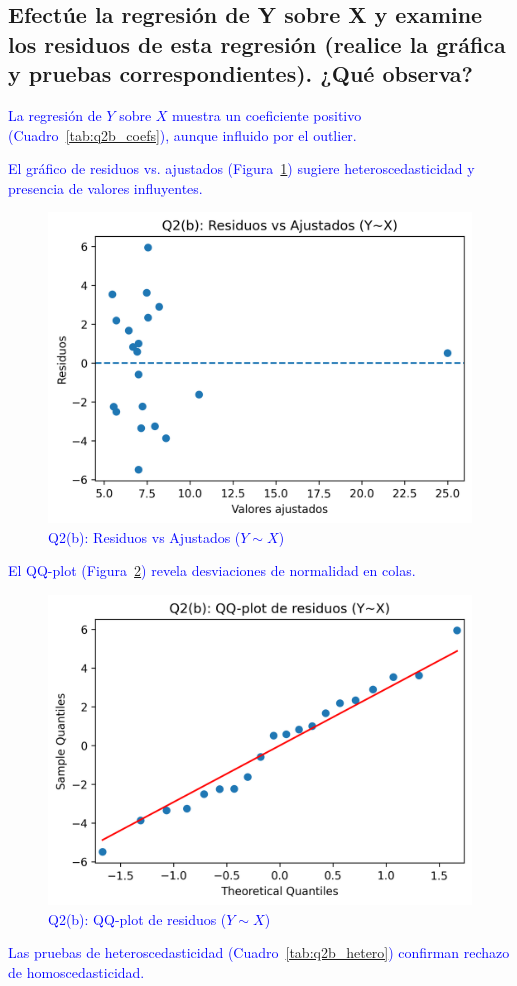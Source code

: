 \documentclass[10pt]{article}
\begin{document}
\subsection{Efectúe la regresión de Y sobre X y examine los residuos de esta regresión (realice la gráfica y pruebas correspondientes). ¿Qué observa?}
    \textcolor{blue}{
        La regresión de $Y$ sobre $X$ muestra un coeficiente positivo (Cuadro~\ref{tab:q2b_coefs}), aunque influido por el outlier.
        
        El gráfico de residuos vs. ajustados (Figura~\ref{fig:q2_b_resid}) sugiere heteroscedasticidad y presencia de valores influyentes.
        \begin{figure}[H]
            \centering
            \includegraphics[width=0.45\linewidth]{../plots/python/ex2/q2_b_resid_vs_fitted.png}
            \caption{Q2(b): Residuos vs Ajustados ($Y\sim X$)}
            \label{fig:q2_b_resid}
        \end{figure}
        El QQ-plot (Figura~\ref{fig:q2_b_qq}) revela desviaciones de normalidad en colas.
        \begin{figure}[H]
            \centering
            \includegraphics[width=0.45\linewidth]{../plots/python/ex2/q2_b_resid_qqplot.png}
            \caption{Q2(b): QQ-plot de residuos ($Y\sim X$)}
            \label{fig:q2_b_qq}
        \end{figure}
        Las pruebas de heteroscedasticidad (Cuadro~\ref{tab:q2b_hetero}) confirman rechazo de homoscedasticidad.
        
    }
\end{document}
